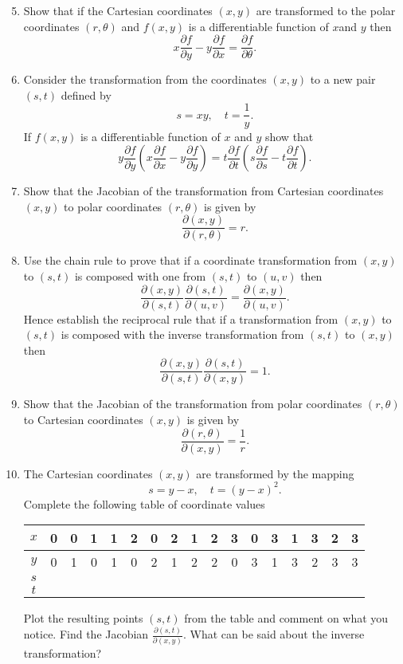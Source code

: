 \documentclass[a4paper]{amsart}
\begin{document}
\begin{enumerate}
    \setcounter{enumi}{4}
\item




Show that if the Cartesian  coordinates $(x,y)$ are transformed to the polar coordinates $(r,\theta)$ and $f(x,y)$ is a differentiable function of $x$and $y$ then 
$$x \frac{\partial f}{\partial y} - y \frac{\partial f}{\partial x} = \frac{\partial f}{\partial \theta}.$$
\item
Consider the transformation from the coordinates $(x,y)$ to a new pair $(s,t)$ defined by 
$$s=xy, \quad t=\frac{1}{y} .$$
If $f(x,y)$ is a differentiable function of $x$ and $y$ show that 
$$y \frac{\partial f}{\partial y} \left ( x \frac{\partial f}{\partial x} - y \frac{\partial f}{\partial y} \right ) = t \frac{\partial f}{\partial t} \left ( s \frac{\partial f}{\partial s} - t \frac{\partial f}{\partial t} \right ) .$$
\item
Show that the Jacobian of the transformation from Cartesian coordinates $(x,y)$ to polar coordinates $(r,\theta)$ is given by 
$$\frac{\partial (x,y)}{\partial (r, \theta)} = r.$$
\item
Use the chain rule to prove that if a coordinate transformation from $(x,y)$ to $(s,t)$ is composed with one from $(s,t)$ to $(u,v)$ then 
$$\frac{\partial (x,y)}{\partial (s, t)} \frac{\partial (s,t)}{\partial (u, v)} = \frac{\partial (x,y)}{\partial (u,v)}.$$
Hence establish the reciprocal rule that if a transformation from $(x,y)$ to $(s,t)$ is composed with the inverse transformation from $(s,t)$ to $(x,y)$ then 
$$\frac{\partial (x,y)}{\partial (s, t)} \frac{\partial (s,t)}{\partial (x, y)} = 1.$$
\item
Show that the Jacobian of the transformation from polar coordinates $(r,\theta)$ to Cartesian coordinates $(x,y)$ is given by 
$$\frac{\partial (r,\theta)}{\partial (x, y)} = \frac{1}{r}.$$
\item
The Cartesian coordinates $(x,y)$ are transformed by the mapping 
$$ s = y-x, \quad t=(y-x)^2.$$
Complete the following table of coordinate values

\bigskip

\begin{tabular}{|c|c|c|c|c|c|c|c|c|c|c|c|c|c|c|c|c|}
\hline  $x$& 0 & 0 & 1 & 1 & 2 & 0 & 2 & 1 & 2 & 3 & 0 & 3 & 1 & 3 & 2 & 3 \\ 
\hline  $y$& 0 & 1 & 0 & 1 & 0 & 2 & 1 & 2 & 2 & 0 & 3 & 1 & 3 & 2 & 3 & 3 \\ 
\hline  $s$&  &  &  &  &  &  &  &  &  &  &  &  &  &  &  &  \\ 
\hline  $t$&  &  &  &  &  &  &  &  &  &  &  &  &  &  &  &  \\ 
\hline 
\end{tabular} 

\bigskip

Plot the resulting points $(s,t)$ from the table and comment on what you notice. Find the Jacobian $\frac{\partial (s,t)}{\partial (x, y)}.$ What can be said about the inverse transformation?
\end{enumerate}
\end{document}
